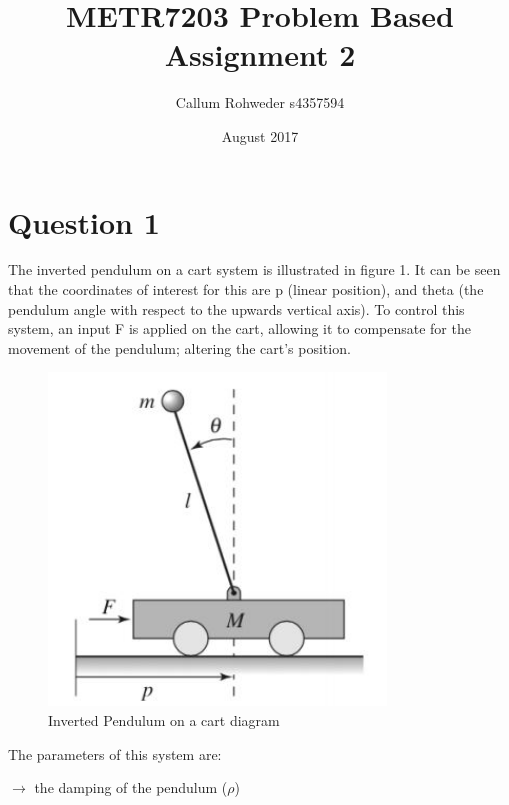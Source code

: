 \documentclass[12pt]{article}
\begin{document}
\title{METR7203 Problem Based Assignment 2}
\author{Callum Rohweder s4357594}
\date{August 2017}

\maketitle

\section{Question 1}
The inverted pendulum on a cart system is illustrated in figure 1. It can be seen that the coordinates of interest for this are p (linear position), and theta (the pendulum angle with respect to the upwards vertical axis). To control this system, an input F is applied on the cart, allowing it to compensate for the movement of the pendulum; altering the cart's position. 


\begin{center}
\begin{figure}[htb]
	\includegraphics[width=0.8\textwidth]{mass_and_cart.jpg}
\caption{Inverted Pendulum on a cart diagram}
\end{figure}
\end{center}




The parameters of this system are:
\vspace{\baselineskip}

\vspace{\baselineskip} $\rightarrow$ the damping of the pendulum ($\rho$)
\end{document}
